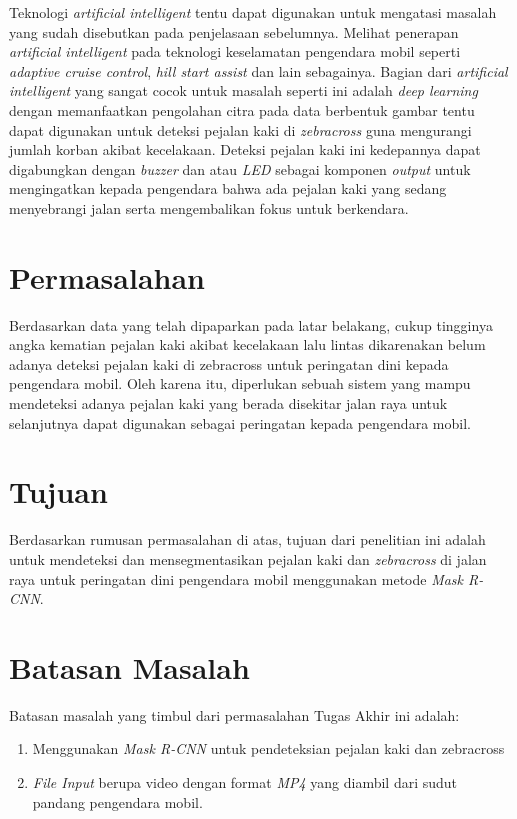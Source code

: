 Teknologi \textit{artificial intelligent} tentu dapat digunakan untuk mengatasi masalah yang sudah disebutkan pada penjelasaan sebelumnya. Melihat penerapan \textit{artificial intelligent} pada teknologi keselamatan pengendara mobil seperti \textit{adaptive cruise control}, \textit{hill start assist} dan lain sebagainya. Bagian dari \textit{artificial intelligent} yang sangat cocok untuk masalah seperti ini adalah \textit{deep learning} dengan memanfaatkan pengolahan citra pada data berbentuk gambar tentu dapat digunakan untuk deteksi pejalan kaki di \textit{zebracross} guna mengurangi jumlah korban akibat kecelakaan. Deteksi pejalan kaki ini kedepannya dapat digabungkan dengan \textit{buzzer} dan atau \textit{LED} sebagai komponen \textit{output} untuk mengingatkan kepada pengendara bahwa ada pejalan kaki yang sedang menyebrangi jalan serta mengembalikan fokus untuk berkendara.

\section{Permasalahan}
\label{sec:permasalahan}

Berdasarkan data yang telah dipaparkan pada latar belakang, cukup tingginya angka kematian pejalan kaki akibat kecelakaan lalu lintas dikarenakan belum adanya deteksi pejalan kaki di zebracross untuk peringatan dini kepada pengendara mobil. Oleh karena itu, diperlukan sebuah sistem yang mampu mendeteksi adanya pejalan kaki yang berada disekitar jalan raya untuk selanjutnya dapat digunakan sebagai peringatan kepada pengendara mobil.

\section{Tujuan}
\label{sec:Tujuan}

Berdasarkan rumusan permasalahan di atas, tujuan dari penelitian ini adalah untuk mendeteksi dan mensegmentasikan pejalan kaki dan \textit{zebracross} di jalan raya untuk peringatan dini pengendara mobil menggunakan metode \textit{Mask R-CNN}.



\section{Batasan Masalah}
\label{sec:batasanmasalah}

Batasan masalah yang timbul dari permasalahan Tugas Akhir ini adalah:

\begin{enumerate}[nolistsep]

  \item Menggunakan \textit{Mask R-CNN} untuk pendeteksian pejalan kaki dan zebracross
  \item \textit{File Input} berupa video dengan format \textit{MP4} yang diambil dari sudut pandang pengendara mobil. 

\end{enumerate}

